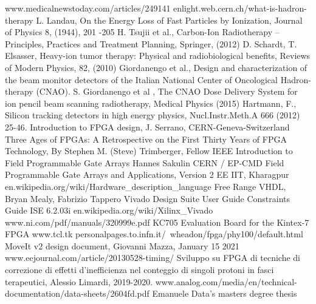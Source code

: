 \begin{thebibliography}{00}	
	www.medicalnewstoday.com/articles/249141
	enlight.web.cern.ch/what-is-hadron-therapy
	L. Landau, On the Energy Loss of Fast Particles by Ionization, Journal of
	Physics 8, (1944), 201 -205
	H. Tsujii et al., Carbon-Ion Radiotherapy – Principles, Practices and Treatment
	Planning, Springer, (2012)
	D. Schardt, T. Elsasser, Heavy-ion tumor therapy: Physical and radiobiological
	benefits, Reviews of Modern Physics, 82, (2010)
	Giordanengo et al., Design and characterization of the beam monitor detectors
	of the Italian National Center of Oncological Hadron-therapy (CNAO).
	S. Giordanengo et al , The CNAO Dose Delivery System for ion pencil beam
	scanning radiotherapy, Medical Physics (2015)
	Hartmann, F., Silicon tracking detectors in high energy physics, Nucl.Instr.Meth.A
	666 (2012) 25-46.
	Introduction to FPGA design, J. Serrano, CERN-Geneva-Switzerland
	Three Ages of FPGAs: A Retrospective on the First Thirty Years of FPGA Technology, By Stephen M. (Steve) Trimberger, Fellow IEEE
	Introduction to Field Programmable Gate Arrays Hannes Sakulin CERN / EP-CMD
	Field Programmable Gate Arrays and Applications, Version 2 EE IIT, Kharagpur
	en.wikipedia.org/wiki/Hardware\_description\_language
	Free Range VHDL, Bryan Mealy, Fabrizio Tappero
	Vivado Design Suite User Guide
	Constraints Guide ISE 6.2.03i
	en.wikipedia.org/wiki/Xilinx\_Vivado
	www.ni.com/pdf/manuals/320999e.pdf
	KC705 Evaluation Board for the Kintex-7 FPGA	
	www.tcl.tk
	personalpages.to.infn.it/~wheadon/fpga/phy100/default.html
	MoveIt v2 design document, Giovanni Mazza, January 15 2021
	www.eejournal.com/article/20130528-timing/
	Sviluppo su FPGA di tecniche di correzione di effetti d'inefficienza nel conteggio di singoli protoni in fasci terapeutici, Alessio Limardi, 2019-2020.
	www.analog.com/media/en/technical-documentation/data-sheets/2604fd.pdf
	Emanuele Data's masters degree thesis 
	
	
\end{thebibliography}
